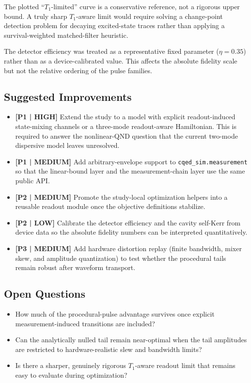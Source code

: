 \documentclass[11pt, a4paper]{article}
\begin{document}
The plotted ``$T_1$-limited'' curve is a conservative reference, not a rigorous upper
bound. A truly sharp $T_1$-aware limit would require solving a change-point detection
problem for decaying excited-state traces rather than applying a survival-weighted
matched-filter heuristic.

The detector efficiency was treated as a representative fixed parameter
($\eta=0.35$) rather than as a device-calibrated value. This affects the absolute
fidelity scale but not the relative ordering of the pulse families.

\subsection{Suggested Improvements}
\begin{itemize}
  \item \textbf{[P1 | HIGH]} Extend the study to a model with explicit
  readout-induced state-mixing channels or a three-mode readout-aware Hamiltonian. This is
  required to answer the nonlinear-QND question that the current two-mode dispersive model
  leaves unresolved.
  \item \textbf{[P1 | MEDIUM]} Add arbitrary-envelope support to
  \texttt{cqed\_sim.measurement} so that the linear-bound layer and the measurement-chain
  layer use the same public API.
  \item \textbf{[P2 | MEDIUM]} Promote the study-local optimization helpers into a
  reusable readout module once the objective definitions stabilize.
  \item \textbf{[P2 | LOW]} Calibrate the detector efficiency and the cavity self-Kerr from
  device data so the absolute fidelity numbers can be interpreted quantitatively.
  \item \textbf{[P3 | MEDIUM]} Add hardware distortion replay (finite bandwidth, mixer
  skew, and amplitude quantization) to test whether the procedural tails remain robust
  after waveform transport.
\end{itemize}

\subsection{Open Questions}
\begin{itemize}
  \item How much of the procedural-pulse advantage survives once explicit
  measurement-induced transitions are included?
  \item Can the analytically nulled tail remain near-optimal when the tail amplitudes are
  restricted to hardware-realistic slew and bandwidth limits?
  \item Is there a sharper, genuinely rigorous $T_1$-aware readout limit that remains easy
  to evaluate during optimization?
\end{itemize}



\end{document}

